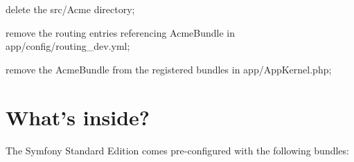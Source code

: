 \begin{DoxyItemize}
\item delete the {\ttfamily src/\-Acme} directory;
\item remove the routing entries referencing Acme\-Bundle in {\ttfamily app/config/routing\-\_\-dev.\-yml};
\item remove the Acme\-Bundle from the registered bundles in {\ttfamily app/\-App\-Kernel.\-php};
\end{DoxyItemize}

\section*{What's inside?}

The Symfony Standard Edition comes pre-\/configured with the following bundles\-:


